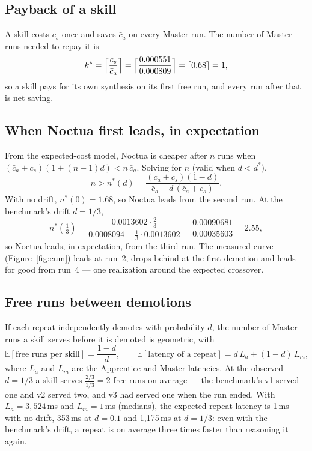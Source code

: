 \documentclass[11pt]{article}
\begin{document}
\subsection{Payback of a skill}
A skill costs $c_s$ once and saves $\bar c_a$ on every Master run. The number of Master runs needed to repay it is
\begin{equation}
k^\ast=\Bigl\lceil\frac{c_s}{\bar c_a}\Bigr\rceil=\Bigl\lceil\frac{0.000551}{0.000809}\Bigr\rceil=\lceil0.68\rceil=1,
\end{equation}
so a skill pays for its own synthesis on its first free run, and every run after that is net saving.

\subsection{When Noctua first leads, in expectation}
From the expected-cost model, Noctua is cheaper after $n$ runs when
$(\bar c_a+c_s)(1+(n-1)d)<n\,\bar c_a$. Solving for $n$ (valid when $d<d^\ast$),
\begin{equation}
n>n^\ast(d)=\frac{(\bar c_a+c_s)(1-d)}{\bar c_a-d\,(\bar c_a+c_s)} .
\end{equation}
With no drift, $n^\ast(0)=1.68$, so Noctua leads from the second run. At the benchmark's drift $d=1/3$,
\[
n^\ast(\tfrac13)=\frac{0.0013602\cdot\tfrac23}{0.0008094-\tfrac13\cdot0.0013602}=\frac{0.00090681}{0.00035603}=2.55,
\]
so Noctua leads, in expectation, from the third run. The measured curve (Figure~\ref{fig:cum}) leads at run~2,
drops behind at the first demotion and leads for good from run~4 --- one realization around the expected crossover.

\subsection{Free runs between demotions}
If each repeat independently demotes with probability $d$, the number of Master runs a skill serves before it is
demoted is geometric, with
\begin{equation}
\mathbb{E}[\text{free runs per skill}]=\frac{1-d}{d}, \qquad \mathbb{E}[\text{latency of a repeat}]=d\,L_a+(1-d)\,L_m,
\end{equation}
where $L_a$ and $L_m$ are the Apprentice and Master latencies. At the observed $d=1/3$ a skill serves
$\tfrac{2/3}{1/3}=2$ free runs on average --- the benchmark's v1 served one and v2 served two, and v3 had served one
when the run ended. With $L_a=3{,}524$\,ms and $L_m=1$\,ms (medians), the expected repeat latency is 1\,ms with no drift,
353\,ms at $d=0.1$ and 1{,}175\,ms at $d=1/3$: even with the benchmark's drift, a repeat is on average three times
faster than reasoning it again.
\end{document}
